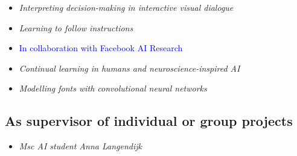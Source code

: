 {{{{{{{{{
{\begin{itemize}
  \item[] \textit{Interpreting decision-making in interactive visual dialogue}
\end{itemize}}}

{
{\begin{itemize}
  \item[] \textit{Learning to follow instructions}
  \item[] \textcolor{blue}{\normalfont In collaboration with Facebook AI Research\vspace{1mm}}
\end{itemize}}}

{
{\begin{itemize}
  \item[] \textit{Continual learning in humans and neuroscience-inspired AI}
\end{itemize}}}

{
{\begin{itemize}
  \item[] \textit{Modelling fonts with convolutional neural networks}
\end{itemize}}}

\vspace{1mm}

\subsection{As supervisor of individual or group projects}

{
{\begin{itemize}
  \item[] \textit{Msc AI student Anna Langendijk}
\end{itemize}}}

}}}}}}}}
